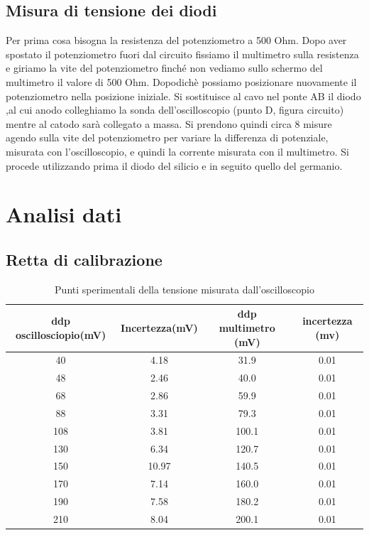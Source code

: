 \documentclass{article}
\begin{document}
\subsection{Misura di tensione dei diodi}
Per prima cosa bisogna la resistenza del potenziometro a 500 Ohm. Dopo aver spostato il potenziometro fuori dal circuito fissiamo il multimetro sulla resistenza e giriamo la vite del potenziometro finché non vediamo sullo schermo del multimetro il valore di 500 Ohm. Dopodichè possiamo posizionare nuovamente il potenziometro nella posizione iniziale.
Si sostituisce al cavo nel ponte AB il diodo ,al cui anodo colleghiamo la sonda dell’oscilloscopio (punto D, figura circuito) mentre  al catodo sarà collegato a massa.
Si prendono quindi circa 8 misure agendo sulla vite del potenziometro per variare la differenza di potenziale, misurata con l’oscilloscopio, e quindi la corrente misurata con il multimetro. 
Si procede utilizzando prima il diodo del silicio e in seguito quello del germanio.

\section{Analisi dati}
\subsection{Retta di calibrazione}
\begin{table}[h!]
\centering
 \begin{tabular}{||c|c||c|c|} 
 \hline
 ddp oscillosciopio(mV) & Incertezza(mV) & ddp multimetro (mV) & incertezza (mv) \\ [0.5ex]
 \hline\hline
 40 & 4.18 & 31.9 & 0.01 \\
 48 & 2.46 & 40.0 & 0.01 \\
 68 & 2.86 & 59.9 & 0.01 \\
 88 & 3.31 & 79.3 & 0.01 \\
 108 & 3.81 & 100.1 & 0.01 \\
 130 & 6.34 & 120.7 & 0.01 \\
 150 & 10.97 & 140.5 & 0.01 \\
 170 & 7.14 & 160.0 & 0.01 \\
 190 & 7.58 & 180.2 & 0.01 \\
 210 & 8.04 & 200.1 & 0.01 \\
\hline
 \end{tabular}
\caption{Punti sperimentali della tensione misurata dall'oscilloscopio}
\end{table}
\end{document}
